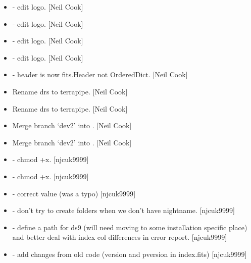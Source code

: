 \documentclass[a4paper,10pt,english]{report}
\begin{document}
\begin{itemize}
\item {} 
 - edit logo. {[}Neil Cook{]}

\item {} 
 - edit logo. {[}Neil Cook{]}

\item {} 
 - edit logo. {[}Neil Cook{]}

\item {} 
 - edit logo. {[}Neil Cook{]}

\item {} 
 - header is now fits.Header not OrderedDict. {[}Neil Cook{]}

\item {} 
Rename drs to terrapipe. {[}Neil Cook{]}

\item {} 
Rename drs to terrapipe. {[}Neil Cook{]}

\item {} 
Merge branch ‘dev2’ into . {[}Neil Cook{]}

\item {} 
Merge branch ‘dev2’ into . {[}Neil Cook{]}

\item {} 
 - chmod +x. {[}njcuk9999{]}

\item {} 
 - chmod +x. {[}njcuk9999{]}

\item {} 
 - correct 
value (was a typo) {[}njcuk9999{]}

\item {} 
 - don’t try to create folders when we don’t have
nightname. {[}njcuk9999{]}

\item {} 
 - define a path for ds9 (will need moving to some
installation specific place) and better deal with index col
differences in error report. {[}njcuk9999{]}

\item {} 
 - add changes from old code (version
and pversion in index.fits) {[}njcuk9999{]}


\end{itemize}
\end{document}
